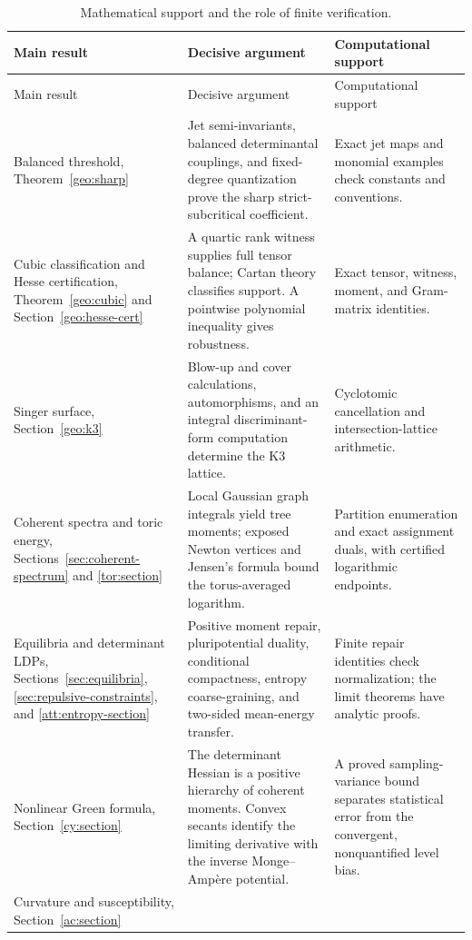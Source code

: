 \begingroup
\small
\begin{longtable}{p{.22\linewidth}p{.42\linewidth}p{.26\linewidth}}
\caption{Mathematical support and the role of finite verification.}
\label{tab:claim-support}\\
\toprule
Main result & Decisive argument & Computational support\\
\midrule
\endfirsthead
\toprule Main result & Decisive argument & Computational support\\
\midrule
\endhead
Balanced threshold, Theorem~\ref{geo:sharp}
& Jet semi-invariants, balanced determinantal couplings, and fixed-degree
quantization prove the sharp strict-subcritical coefficient.
& Exact jet maps and monomial examples check constants and conventions.\\[5pt]
Cubic classification and Hesse certification,
Theorem~\ref{geo:cubic} and Section~\ref{geo:hesse-cert}
& A quartic rank witness supplies full tensor balance; Cartan theory
classifies support. A pointwise polynomial inequality gives robustness.
& Exact tensor, witness, moment, and Gram-matrix identities.\\[5pt]
Singer surface, Section~\ref{geo:k3}
& Blow-up and cover calculations, automorphisms, and an integral
discriminant-form computation determine the K3 lattice.
& Cyclotomic cancellation and intersection-lattice arithmetic.\\[5pt]
Coherent spectra and toric energy,
Sections~\ref{sec:coherent-spectrum} and \ref{tor:section}
& Local Gaussian graph integrals yield tree moments; exposed Newton
vertices and Jensen's formula bound the torus-averaged logarithm.
& Partition enumeration and exact assignment duals, with certified
logarithmic endpoints.\\[5pt]
Equilibria and determinant LDPs,
Sections~\ref{sec:equilibria}, \ref{sec:repulsive-constraints},
and \ref{att:entropy-section}
& Positive moment repair, pluripotential duality, conditional compactness,
entropy coarse-graining, and two-sided mean-energy transfer.
& Finite repair identities check normalization; the limit theorems have
analytic proofs.\\[5pt]
Nonlinear Green formula, Section~\ref{cy:section}
& The determinant Hessian is a positive hierarchy of coherent moments.
Convex secants identify the limiting derivative with the inverse
Monge--Amp\`ere potential.
& A proved sampling-variance bound separates statistical error from
the convergent, nonquantified level bias.\\[5pt]
Curvature and susceptibility, Section~\ref{ac:section}

\end{longtable}

